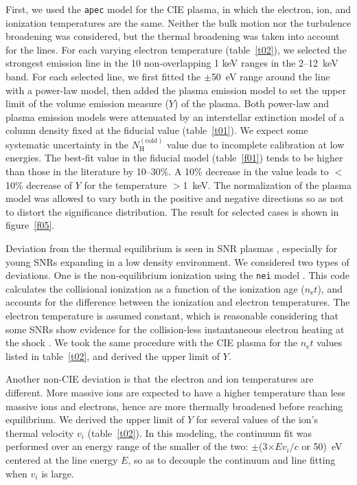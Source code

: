 \documentclass[]{pasj01}
\begin{document}
First, we used the \texttt{apec} model \citep{smith01} for the CIE plasma, in which the
electron, ion, and ionization temperatures are the same. Neither the bulk motion nor the
turbulence broadening was considered, but the thermal broadening was taken into account
for the lines. For each varying electron temperature (table~\ref{t02}), we selected the
strongest emission line in the 10 non-overlapping 1 keV ranges in the 2--12~keV
band. For each selected line, we first fitted the $\pm$50~eV range around the line with
a power-law model, then added the plasma emission model to set the upper limit of the
volume emission measure ($Y$) of the plasma. Both power-law and plasma emission models
were attenuated by an interstellar extinction model of a column density fixed at the
fiducial value (table~\ref{t01}). We expect some systematic uncertainty in the
$N_{\mathrm{H}}^{\mathrm{(cold)}}$ value due to incomplete calibration at low
energies. The best-fit value in the fiducial model (table~\ref{f01}) tends to be higher
than those in the literature \citep{kaastra09,weisskopf10} by 10--30\%. A 10\% decrease
in the value leads to $<$10\% decrease of $Y$ for the temperature $>$1~keV. The
normalization of the plasma model was allowed to vary both in the positive and negative
directions so as not to distort the significance distribution. The result for selected
cases is shown in figure~\ref{f05}.

Deviation from the thermal equilibrium is seen in SNR plasmas
\citep{borkowski01,vink12}, especially for young SNRs expanding in a low density
environment. We considered two types of deviations. One is the non-equilibrium
ionization using the \texttt{nei} model \citep{smith10}. This code calculates the
collisional ionization as a function of the ionization age ($n_{\mathrm{e}}t$), and
accounts for the difference between the ionization and electron temperatures. The
electron temperature is assumed constant, which is reasonable considering that some SNRs
show evidence for the collision-less instantaneous electron heating at the shock
\citep{yamaguchi14a}. We took the same procedure with the CIE plasma for the
$n_{\mathrm{e}}t$ values listed in table~\ref{t02}, and derived the upper limit of $Y$.

Another non-CIE deviation is that the electron and ion temperatures are different. More
massive ions are expected to have a higher temperature than less massive ions and
electrons, hence are more thermally broadened before reaching equilibrium. We derived
the upper limit of $Y$ for several values of the ion's thermal velocity $v_{i}$
(table~\ref{t02}). In this modeling, the continuum fit was performed over an energy
range of the smaller of the two: $\pm$(3$\times E v_{i}/c$ or 50)~eV centered at the
line energy $E$, so as to decouple the continuum and line fitting when $v_{i}$ is large.
\end{document}

